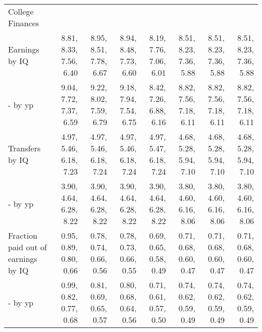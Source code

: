 \begin{tabular}{lrrrrrrr}
\hline
College Finances &   &   &   &   &   &   &   \\ 
Earnings by IQ & 8.81, 8.33, 7.56, 6.40  & 8.95, 8.51, 7.78, 6.67  & 8.94, 8.48, 7.73, 6.60  & 8.19, 7.76, 7.06, 6.01  & 8.51, 8.23, 7.36, 5.88  & 8.51, 8.23, 7.36, 5.88  & 8.51, 8.23, 7.36, 5.88  \\ 
- by yp & 9.04, 7.72, 7.37, 6.59  & 9.22, 8.02, 7.59, 6.79  & 9.18, 7.94, 7.54, 6.75  & 8.42, 7.26, 6.88, 6.16  & 8.82, 7.56, 7.18, 6.11  & 8.82, 7.56, 7.18, 6.11  & 8.82, 7.56, 7.18, 6.11  \\ 
Transfers by IQ & 4.97, 5.46, 6.18, 7.23  & 4.97, 5.46, 6.18, 7.24  & 4.97, 5.46, 6.18, 7.24  & 4.97, 5.47, 6.18, 7.24  & 4.68, 5.28, 5.94, 7.10  & 4.68, 5.28, 5.94, 7.10  & 4.68, 5.28, 5.94, 7.10  \\ 
- by yp & 3.90, 4.64, 6.28, 8.22  & 3.90, 4.64, 6.28, 8.22  & 3.90, 4.64, 6.28, 8.22  & 3.90, 4.64, 6.28, 8.22  & 3.80, 4.60, 6.16, 8.06  & 3.80, 4.60, 6.16, 8.06  & 3.80, 4.60, 6.16, 8.06  \\ 
Fraction paid out of earnings by IQ & 0.95, 0.89, 0.80, 0.66  & 0.78, 0.74, 0.66, 0.56  & 0.78, 0.73, 0.66, 0.55  & 0.69, 0.65, 0.58, 0.49  & 0.71, 0.68, 0.60, 0.47  & 0.71, 0.68, 0.60, 0.47  & 0.71, 0.68, 0.60, 0.47  \\ 
- by yp & 0.99, 0.82, 0.77, 0.68  & 0.81, 0.69, 0.65, 0.57  & 0.80, 0.68, 0.64, 0.56  & 0.71, 0.61, 0.57, 0.50  & 0.74, 0.62, 0.59, 0.49  & 0.74, 0.62, 0.59, 0.49  & 0.74, 0.62, 0.59, 0.49  \\ 
\hline
\end{tabular}%
